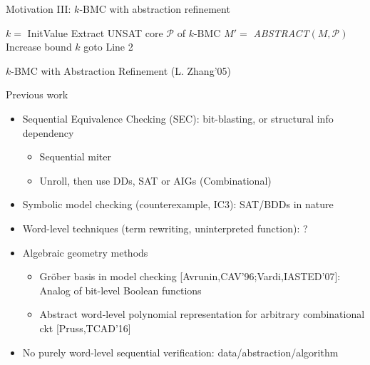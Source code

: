 \documentclass[xcolor=dvipsnames]{beamer}
\newcommand{\bi}{\begin{itemize}}
\newcommand{\ei}{\end{itemize}}
\begin{document}
\begin{frame}[label = motiv3]{\large{Motivation III: $k$-BMC with abstraction refinement}}
\IncMargin{1em}
\begin{algorithm}[H]
\SetAlgoNoLine
  $k = $ InitValue\;
  {
  }
  {
	\alert{Extract UNSAT core $\mathcal P$ of $k$-BMC} \;
	$M' = $ \textit{ABSTRACT}$(M,\mathcal P)$\;
  }
  {
  }
  {
	Increase bound $k$\;
	goto Line 2\;
  }
\caption{$k$-BMC with Abstraction Refinement (L. Zhang'05)}
\end{algorithm}
\DecMargin{1em}
\hyperlink{refine}{}
\end{frame}
\begin{frame}{\large{Previous work}}
\bi
\item Sequential Equivalence Checking (SEC): bit-blasting, or structural info dependency
	\bi
	\item Sequential miter
	\item Unroll, then use DDs, SAT or AIGs (Combinational)
	\ei
\item Symbolic model checking (counterexample, IC3): SAT/BDDs in nature
\item Word-level techniques (term rewriting, uninterpreted function): ?
\item Algebraic geometry methods
	\bi
	\item Gr\"ober basis in model checking [Avrunin,CAV'96;Vardi,IASTED'07]: Analog of bit-level Boolean functions
	\item Abstract word-level polynomial representation for arbitrary combinational ckt [Pruss,TCAD'16]
	\ei
\pause
\item No purely word-level sequential verification: data/abstraction/algorithm
\ei
\end{frame}
\end{document}
